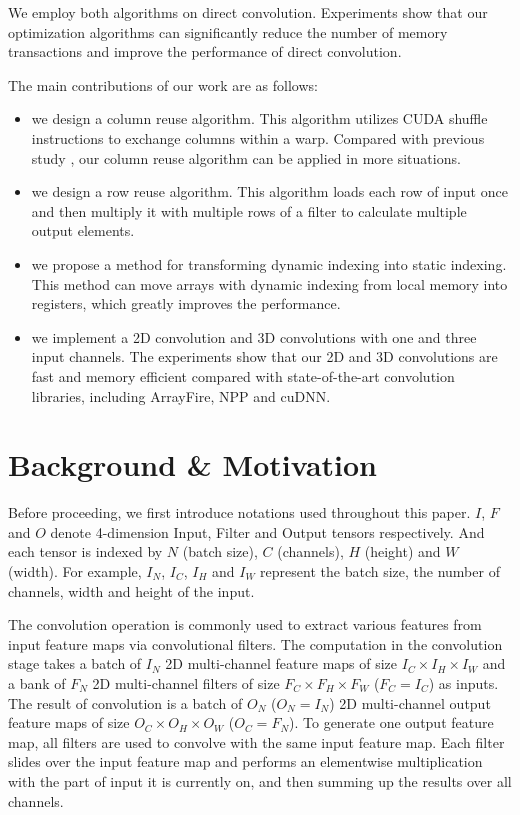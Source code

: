 \documentclass[sigplan,review,anonymous]{acmart}\settopmatter{printfolios=true,printccs=false,printacmref=false}
\begin{document}
We employ both algorithms on direct convolution. Experiments show that our optimization algorithms can significantly reduce the number of memory transactions and improve the performance of direct convolution. 

The main contributions of our work are as follows:
\begin{itemize}
  \item we design a column reuse algorithm. This algorithm utilizes CUDA shuffle instructions to exchange columns within a warp. Compared with previous study \cite{vasilache2014fast}, our column reuse algorithm can be applied in more situations.
  \item we design a row reuse algorithm. This algorithm loads each row of input once and then multiply it with multiple rows of a filter to calculate multiple output elements. 
  \item we propose a method for transforming dynamic indexing into static indexing. This method can move arrays with dynamic indexing from local memory into registers, which greatly improves the performance.
  \item we implement a 2D convolution and 3D convolutions with one and three input channels. The experiments show that our 2D and 3D convolutions are fast and memory efficient compared with state-of-the-art convolution libraries, including ArrayFire, NPP and cuDNN.
\end{itemize}

\section{Background \& Motivation}
Before proceeding, we first introduce notations used throughout this paper. $I$, $F$ and $O$ denote 4-dimension Input, Filter and Output tensors respectively. And each tensor is indexed by $N$ (batch size), $C$ (channels), $H$ (height) and $W$ (width). For example, $I_N$, $I_C$, $I_H$ and $I_W$ represent the batch size, the number of channels, width and height of the input.

The convolution operation is commonly used to extract various features from input feature maps via convolutional filters. The computation in the convolution stage takes a batch of $I_N$ 2D multi-channel feature maps of size $I_C \times I_H \times I_W$ and a bank of $F_N$ 2D multi-channel filters of size $F_C \times F_H \times F_W$ ($F_C = I_C$) as inputs. The result of convolution is a batch of $O_N$ ($O_N=I_N$) 2D multi-channel output feature maps of size $O_C \times O_H \times O_W$ ($O_C=F_N$). To generate one output feature map, all filters are used to convolve with the same input feature map. Each filter slides over the input feature map and performs an elementwise multiplication with the part of input it is currently on, and then summing up the results over all channels.
\end{document}
